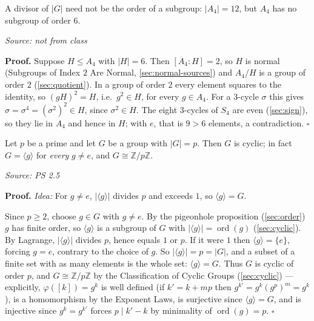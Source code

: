 \documentclass[11pt]{report}
\renewenvironment{proof}[1][Proof]{\noindent\textbf{#1.} }{\hfill$\square$\par\vspace{5pt}}
\newcommand{\srcline}[1]{\par\hfill{\footnotesize\textit{Source: #1}}}
\begin{document}
\begin{exbox}\label{ex:converse-lagrange-fails-a4}
A divisor of $|G|$ need not be the order of a subgroup: $|A_4| = 12$, but $A_4$ has no subgroup of order $6$.
\srcline{not from class}
\end{exbox}

\begin{proof}
Suppose $H \leq A_4$ with $|H| = 6$. Then $[A_4 : H] = 2$, so $H$ is normal (Subgroups of Index $2$ Are Normal, \ref{sec:normal-sources}) and $A_4/H$ is a group of order $2$ (\ref{sec:quotient}). In a group of order $2$ every element squares to the identity, so $(gH)^2 = H$, i.e.\ $g^2 \in H$, for every $g \in A_4$. For a $3$-cycle $\sigma$ this gives $\sigma = \sigma^4 = (\sigma^2)^2 \in H$, since $\sigma^2 \in H$. The eight $3$-cycles of $S_4$ are even (\ref{sec:sign}), so they lie in $A_4$ and hence in $H$; with $e$, that is $9 > 6$ elements, a contradiction.
\end{proof}

\begin{thmbox}\label{thm:groups-prime-order}
Let $p$ be a prime and let $G$ be a group with $|G| = p$. Then $G$ is cyclic; in fact $G = \langle g \rangle$ for \emph{every} $g \neq e$, and $G \cong \mathbb{Z}/p\mathbb{Z}$.
\srcline{PS 2.5}
\end{thmbox}

\begin{proof}
\textit{Idea:} For $g \neq e$, $|\langle g \rangle|$ divides $p$ and exceeds $1$, so $\langle g \rangle = G$.\par
Since $p \geq 2$, choose $g \in G$ with $g \neq e$. By the pigeonhole proposition (\ref{sec:order}) $g$ has finite order, so $\langle g \rangle$ is a subgroup of $G$ with $|\langle g \rangle| = \operatorname{ord}(g)$ (\ref{sec:cyclic}). By Lagrange, $|\langle g \rangle|$ divides $p$, hence equals $1$ or $p$. If it were $1$ then $\langle g \rangle = \{e\}$, forcing $g = e$, contrary to the choice of $g$. So $|\langle g \rangle| = p = |G|$, and a subset of a finite set with as many elements is the whole set: $\langle g \rangle = G$. Thus $G$ is cyclic of order $p$, and $G \cong \mathbb{Z}/p\mathbb{Z}$ by the Classification of Cyclic Groups (\ref{sec:cyclic}) --- explicitly, $\varphi([k]) = g^k$ is well defined (if $k' = k + mp$ then $g^{k'} = g^k(g^p)^m = g^k$), is a homomorphism by the Exponent Laws, is surjective since $\langle g \rangle = G$, and is injective since $g^{k} = g^{k'}$ forces $p \mid k' - k$ by minimality of $\operatorname{ord}(g) = p$.
\end{proof}
\end{document}
